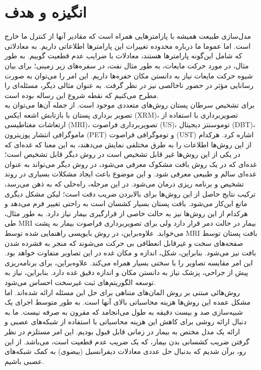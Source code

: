\section*{انگیزه و هدف}
مدل‌سازی طبیعت همیشه با پارامترهایی همراه است که مقادیر آنها از کنترل ما خارج است. اما عموما ما درباره محدوده تغییرات این پارامترها اطلاعاتی داریم. به معادلاتی که شامل این‌گونه پارامترها هستند، معادلات با ضرایب عدم قطعیت گوییم. به طور مثال، در مورد حرکت مایعات، به طور مثال نفت، در سفره‌های زیر زمینی؛ برای بیان شیوه حرکت مایعات نیاز به دانستن مکان حفره‌ها داریم. این امر را می‌توان به صورت رسانایی مؤثر در حضور ناخالصی نیز در نظر گرفت. به عنوان مثالی دیگر، مسئله‌ای را مطرح می‌کنیم که نقطه شروع این رساله بوده است.\\ 
برای تشخیص سرطان پستان روش‌های متعددی موجود است. از جمله آن‌ها می‌توان به تصویر برداری پستان با بازتابش اشعه ایکس (XRM)، تصویربرداری با استفاده از ارتعاشات مغناطیسی (MRI)، تصویربرداری فراصوت (US)، توموسنتز دیجیتال (DBT)، ماموگرافی انتشار پوزیترون (PET) و توموگرافی فراصوت (UST) اشاره کرد. هرکدام از این روش‌ها اطلاعات را به طرق مختلفی نمایش می‌دهند، به این معنا که غده‌ای که در یکی از این روش‌ها غیر قابل تشخیص است در روش دیگر قابل تشخیص است؛ غده‌ای که در یک روش بافت مشکوک معرفی می‌شود، در روش دیگر می‌تواند به عنوان غده‌ای سالم و طبیعی معرفی شود. و این موضوع باعث ایجاد مشکلات بسیاری در روند تشخیص و برنامه ریزی درمان می‌شود. در این مرحله، راه‌حلی که به ذهن می‌رسد، ترکیب نتایج حاصل از این روش‌ها برای بالابردن ضریب دقت است؛ لیکن مشکل دیگری مانع این‌کار می‌شود. بافت پستان بسیار کشسان است به راحتی تغییر فرم می‌دهد و هرکدام از این روش‌ها نیز به حالت خاصی از قرارگیری بیمار نیاز دارد. به طور مثال، طی MRI بیمار در حالت دمر قرار دارد ولی برای تصویربرداری فراصوت بیمار به پشت می‌خوابد. علاوه‌براین، در روش بایوپسی راهنمایی شده توسط MRI بافت پستان توسط صفحه‌های سخت و غیرقابل انعطافی بی حرکت می‌شوند که منجر به فشرده شدن بافت نیز می‌شود. بنابراین، شکل، اندازه و مکان غده در این تصاویر متفاوت خواهد بود. این امر مقایسه تصاویر را با سختی بسیار همراه می‌کند. علاوه‌براین، برای برنامه‌ریزی پیش از جراحی، پزشک نیاز به دانستن مکان و اندازه دقیق غده دارد. بنابراین، نیاز به توسعه الگوریتم‌های ثبت غیرسخت احساس می‌شود.\\
روش‌هائی مبتنی بر روش المان‌های متناهی برای حل این مسئله ارائه شده‌اند. اما مشکل عمده این روش‌ها هزینه محاسباتی بالای آنها است. به طور متوسط اجرای  یک شبیه‌سازی صد و بیست دقیقه به طول می‌انجامد که مقرون به صرفه نیست. ما به دنبال ارائه روشی برای کاهش این هزینه محاسباتی با استفاده از شبکه‌های عصبی و ارائه یک مدل مختص به بیمار در زمانی قابل قبول بودیم. این امر مستلزم در نظر گرفتن ضریب کشسانی بدن بیمار، که یک ضریب عدم قطعیت است، می‌باشد. از این رو، برآن شدیم که بدنبال حل عددی معادلات دیفرانسیل (بیضوی) به کمک شبکه‌های عصبی باشیم.\\ 
